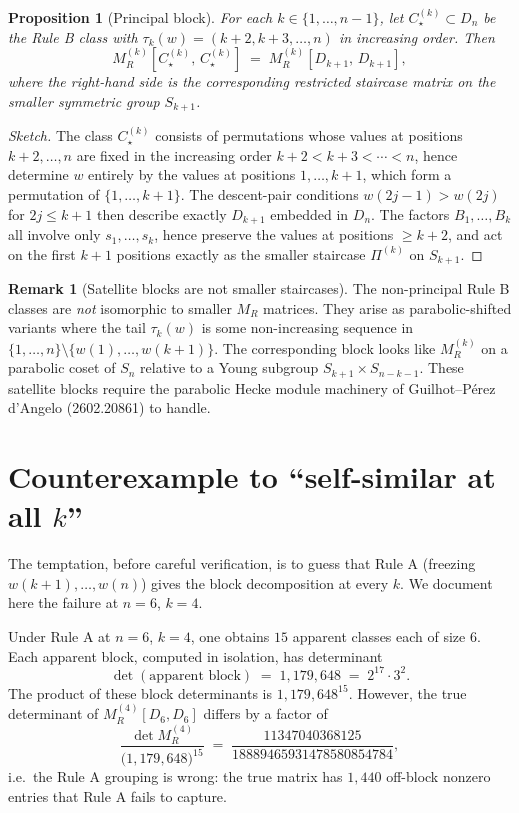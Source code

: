 \documentclass[11pt]{article}
\newtheorem{proposition}[theorem]{Proposition}
\theoremstyle{definition}
\newtheorem{remark}[theorem]{Remark}
\begin{document}
\begin{proposition}[Principal block]
\label{prop:principal}
For each $k \in \{1,\dots,n-1\}$, let $C_\star^{(k)} \subset D_n$ be the Rule B class with $\tau_k(w) = (k+2, k+3,\dots,n)$ in increasing order. Then
\[
M_R^{(k)}[C_\star^{(k)},\, C_\star^{(k)}] \;=\; M_R^{(k)}[D_{k+1},\, D_{k+1}],
\]
where the right-hand side is the corresponding restricted staircase matrix on the smaller symmetric group $S_{k+1}$.
\end{proposition}

\begin{proof}[Sketch]
The class $C_\star^{(k)}$ consists of permutations whose values at positions $k+2,\dots,n$ are fixed in the increasing order $k+2 < k+3 < \cdots < n$, hence determine $w$ entirely by the values at positions $1,\dots,k+1$, which form a permutation of $\{1,\dots,k+1\}$. The descent-pair conditions $w(2j-1) > w(2j)$ for $2j \le k+1$ then describe exactly $D_{k+1}$ embedded in $D_n$. The factors $B_1,\dots,B_k$ all involve only $s_1,\dots,s_k$, hence preserve the values at positions $\ge k+2$, and act on the first $k+1$ positions exactly as the smaller staircase $\Pi^{(k)}$ on $S_{k+1}$.
\end{proof}

\begin{remark}[Satellite blocks are not smaller staircases]
The non-principal Rule B classes are \emph{not} isomorphic to smaller $M_R$ matrices. They arise as parabolic-shifted variants where the tail $\tau_k(w)$ is some non-increasing sequence in $\{1,\dots,n\} \setminus \{w(1),\dots,w(k+1)\}$. The corresponding block looks like $M_R^{(k)}$ on a parabolic coset of $S_n$ relative to a Young subgroup $S_{k+1} \times S_{n-k-1}$. These satellite blocks require the parabolic Hecke module machinery of Guilhot--P\'erez d'Angelo (2602.20861) to handle.
\end{remark}

\section{Counterexample to ``self-similar at all $k$''}
\label{sec:counterexample}

The temptation, before careful verification, is to guess that Rule A (freezing $w(k+1),\dots,w(n)$) gives the block decomposition at every $k$. We document here the failure at $n = 6$, $k = 4$.

Under Rule A at $n=6$, $k=4$, one obtains $15$ apparent classes each of size $6$. Each apparent block, computed in isolation, has determinant
\[
\det(\text{apparent block}) \;=\; 1{,}179{,}648 \;=\; 2^{17} \cdot 3^2.
\]
The product of these block determinants is $1{,}179{,}648^{15}$. However, the true determinant of $M_R^{(4)}[D_6, D_6]$ differs by a factor of
\[
\frac{\det M_R^{(4)}}{\bigl(1{,}179{,}648\bigr)^{15}} \;=\; \frac{11347040368125}{18889465931478580854784},
\]
i.e.\ the Rule A grouping is wrong: the true matrix has $1{,}440$ off-block nonzero entries that Rule A fails to capture.
\end{document}
